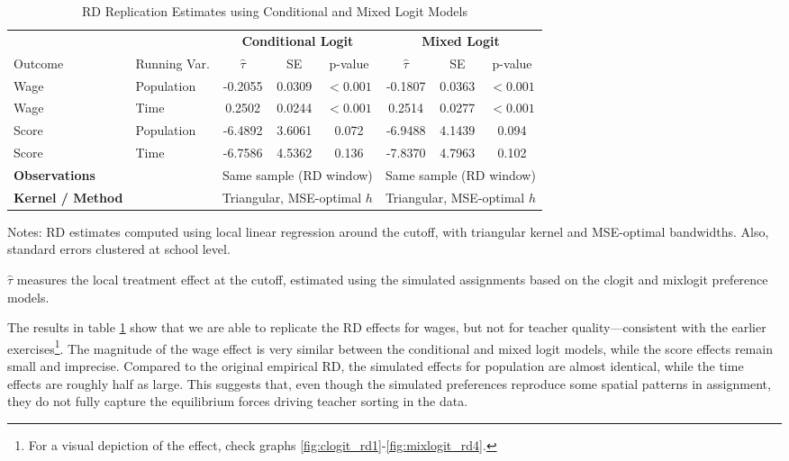 \documentclass{article}
\begin{document}
\begin{table}[H]
\centering
\caption{RD Replication Estimates using Conditional and Mixed Logit Models}
\label{tab:rd_replication}
\begin{threeparttable}
\begin{tabular}{llcccccc}
\toprule
 & & \multicolumn{3}{c}{\textbf{Conditional Logit}} & \multicolumn{3}{c}{\textbf{Mixed Logit}} \\
\cmidrule(lr){3-5} \cmidrule(lr){6-8}
Outcome & Running Var. & $\hat{\tau}$ & SE & p-value & $\hat{\tau}$ & SE & p-value \\
\midrule
Wage  & Population & -0.2055 & 0.0309 & $<0.001$ & -0.1807 & 0.0363 & $<0.001$ \\
Wage  & Time       &  0.2502 & 0.0244 & $<0.001$ &  0.2514 & 0.0277 & $<0.001$ \\
Score & Population & -6.4892 & 3.6061 & 0.072 & -6.9488 & 4.1439 & 0.094 \\
Score & Time       & -6.7586 & 4.5362 & 0.136 & -7.8370 & 4.7963 & 0.102 \\
\midrule
\textbf{Observations} &  & \multicolumn{3}{c}{Same sample (RD window)} & \multicolumn{3}{c}{Same sample (RD window)} \\
\textbf{Kernel / Method} &  & \multicolumn{3}{c}{Triangular, MSE-optimal $h$} & \multicolumn{3}{c}{Triangular, MSE-optimal $h$} \\
\bottomrule
\end{tabular}
\begin{tablenotes}
\footnotesize
\item Notes: RD estimates computed using local linear regression around the cutoff, with triangular kernel and MSE-optimal bandwidths. Also, standard errors clustered at school level.
\item $\hat{\tau}$ measures the local treatment effect at the cutoff, estimated using the simulated assignments based on the clogit and mixlogit preference models.
\end{tablenotes}
\end{threeparttable}
\end{table}

The results in table \ref{tab:rd_replication} show that we are able to replicate the RD effects for wages, but not for teacher quality—consistent with the earlier exercises\footnote{For a visual depiction of the effect, check graphs \ref{fig:clogit_rd1}-\ref{fig:mixlogit_rd4}.}. The magnitude of the wage effect is very similar between the conditional and mixed logit models, while the score effects remain small and imprecise. Compared to the original empirical RD, the simulated effects for population are almost identical, while the time effects are roughly half as large. This suggests that, even though the simulated preferences reproduce some spatial patterns in assignment, they do not fully capture the equilibrium forces driving teacher sorting in the data.
\end{document}
